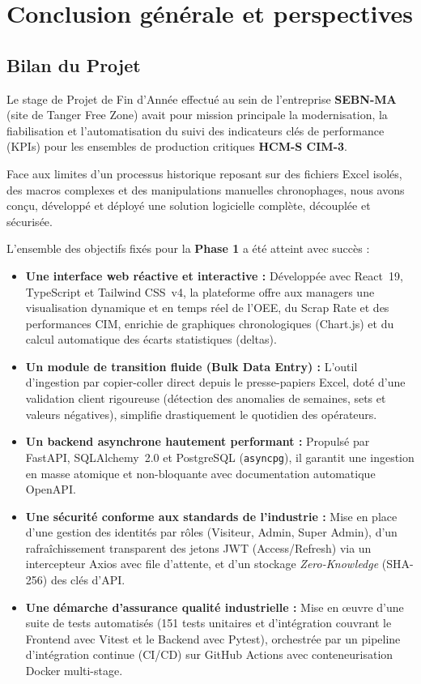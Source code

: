 \cleardoublepage
{}
\chapter*{Conclusion générale et perspectives}

\section*{Bilan du Projet}
Le stage de Projet de Fin d'Année effectué au sein de l'entreprise \textbf{SEBN-MA} (site de Tanger Free Zone) avait pour mission principale la modernisation, la fiabilisation et l'automatisation du suivi des indicateurs clés de performance (KPIs) pour les ensembles de production critiques \textbf{HCM-S CIM-3}.

Face aux limites d'un processus historique reposant sur des fichiers Excel isolés, des macros complexes et des manipulations manuelles chronophages, nous avons conçu, développé et déployé une solution logicielle complète, découplée et sécurisée. 

L'ensemble des objectifs fixés pour la \textbf{Phase 1} a été atteint avec succès :
\begin{itemize}
    \item \textbf{Une interface web réactive et interactive :} Développée avec React~19, TypeScript et Tailwind CSS~v4, la plateforme offre aux managers une visualisation dynamique et en temps réel de l'OEE, du Scrap Rate et des performances CIM, enrichie de graphiques chronologiques (Chart.js) et du calcul automatique des écarts statistiques (deltas).
    \item \textbf{Un module de transition fluide (Bulk Data Entry) :} L'outil d'ingestion par copier-coller direct depuis le presse-papiers Excel, doté d'une validation client rigoureuse (détection des anomalies de semaines, sets et valeurs négatives), simplifie drastiquement le quotidien des opérateurs.
    \item \textbf{Un backend asynchrone hautement performant :} Propulsé par FastAPI, SQLAlchemy~2.0 et PostgreSQL (\texttt{asyncpg}), il garantit une ingestion en masse atomique et non-bloquante avec documentation automatique OpenAPI.
    \item \textbf{Une sécurité conforme aux standards de l'industrie :} Mise en place d'une gestion des identités par rôles (Visiteur, Admin, Super Admin), d'un rafraîchissement transparent des jetons JWT (Access/Refresh) via un intercepteur Axios avec file d'attente, et d'un stockage \textit{Zero-Knowledge} (SHA-256) des clés d'API.
    \item \textbf{Une démarche d'assurance qualité industrielle :} Mise en œuvre d'une suite de tests automatisés (151 tests unitaires et d'intégration couvrant le Frontend avec Vitest et le Backend avec Pytest), orchestrée par un pipeline d'intégration continue (CI/CD) sur GitHub Actions avec conteneurisation Docker multi-stage.
\end{itemize}

